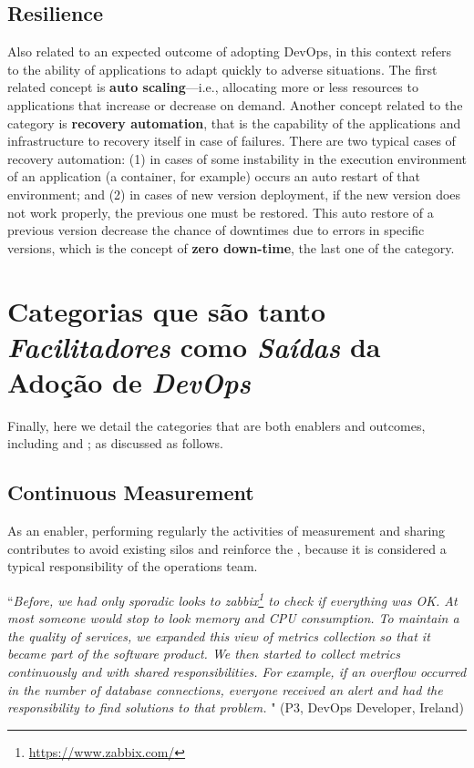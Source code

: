 \subsection*{Resilience}

Also related to an expected outcome of adopting DevOps,  in this
context refers to the ability of applications to adapt quickly to adverse situations.
The first related concept is \textbf{auto scaling}---i.e.,
allocating more or less resources to applications that increase or
decrease on demand. Another concept related to
the  category is \textbf{recovery automation}, that is
the capability of the applications and infrastructure to recovery itself in case of
failures. There are two typical cases of recovery automation: (1) in cases
of some instability in the execution environment of an application (a
container, for example) occurs an auto restart of that environment; and (2) in
cases of new version deployment, if the new version does not work properly, the
previous one must be restored. This auto restore of a previous version
decrease the chance of downtimes due to errors in specific versions, which
is the concept of \textbf{zero down-time}, the last one of the  category.

\section{Categorias que são tanto \emph{Facilitadores} como \emph{Saídas} da Adoção de \emph{DevOps}}
\label{secao_facilitadores_e_saidas}

Finally, here we detail the categories that are both enablers
and outcomes, including 
and ; as discussed as follows.

\subsection{Continuous Measurement}

As an enabler, performing regularly the
activities of measurement and sharing
contributes to avoid existing silos and reinforce the \cc, because it is
considered a typical responsibility of the operations team.

\begin{mq}
``\emph{Before, we had only sporadic looks to
zabbix\footnote{\url{https://www.zabbix.com/}} to check if everything was OK.
At most someone would stop to look memory and CPU consumption. To maintain a
the quality of services, we expanded this view of metrics collection so that it
became part of the software product. We then started to collect metrics continuously
and with shared responsibilities. For example, if an overflow occurred in the
number of database connections, everyone received an alert and had
the responsibility to find solutions to that problem. %
}" (P3, DevOps Developer, Ireland)
\end{mq}


